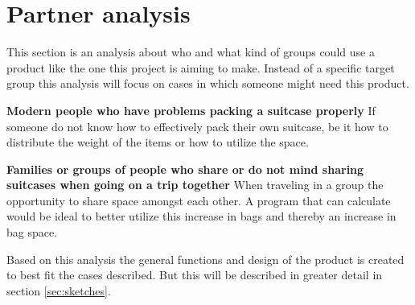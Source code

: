 \section{Partner analysis}

This section is an analysis about who and what kind of groups could use a product like the one this project is aiming to make.
Instead of a specific target group this analysis will focus on cases in which someone might need this product.

\textbf{Modern people who have problems packing a suitcase properly}
If someone do not know how to effectively pack their own suitcase, be it how to distribute the weight of the items or how to utilize the space.

\textbf{Families or groups of people who share or do not mind sharing suitcases when going on a trip together}
When traveling in a group the opportunity to share space amongst each other. A program that can calculate would be ideal to better utilize this increase in bags and thereby an increase in bag space. 

Based on this analysis the general functions and design of the product is created to best fit the cases described. But this will be described in greater detail in section \ref{sec:sketches}.